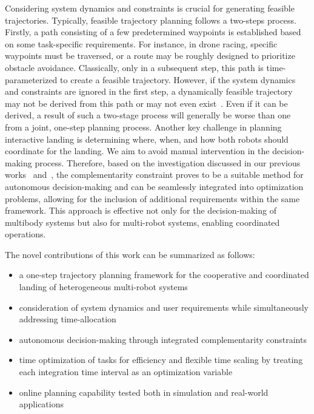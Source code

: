 \documentclass[conference,preprint]{IEEEtran}
\begin{document}
Considering system dynamics and constraints is crucial for generating feasible trajectories. Typically, feasible trajectory planning follows a two-steps process. Firstly, a path consisting of a few predetermined waypoints is established based on some task-specific requirements. For instance, in drone racing, specific waypoints must be traversed, or a route may be roughly designed to prioritize obstacle avoidance. 
Classically, only in a subsequent step, this path is time-parameterized to create a feasible trajectory. However, if the system dynamics and constraints are ignored in the first step, a dynamically feasible trajectory may not be derived from this path or may not even exist~\cite{Tang2020}. Even if it can be derived, a result of such a two-stage process will generally be worse than one from a joint, one-step planning process.
Another key challenge in planning interactive landing is determining where, when, and how both robots should coordinate for the landing. We aim to avoid manual intervention in the decision-making process. Therefore, based on the investigation discussed in our previous works~\cite{Luo2023} and~\cite{Chen2024}, the complementarity constraint proves to be a suitable method for autonomous decision-making and can be seamlessly integrated into optimization problems, allowing for the inclusion of additional requirements within the same framework. This approach is effective not only for the decision-making of multibody systems but also for multi-robot systems, enabling coordinated operations.

The novel contributions of this work can be summarized as follows:

\begin{itemize}
  \item a one-step trajectory planning framework for the cooperative and coordinated landing of heterogeneous multi-robot systems
  \item consideration of system dynamics and user requirements while simultaneously addressing time-allocation
  \item autonomous decision-making through integrated complementarity constraints
  \item time optimization of tasks for efficiency and flexible time scaling by treating each integration time interval as an optimization variable
  \item online planning capability tested both in simulation and real-world applications
\end{itemize}
\end{document}
